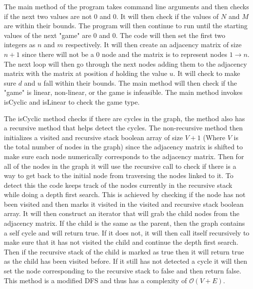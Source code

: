 \documentclass[11pt]{article}
\begin{document}
The main method of the program takes command line arguments and then checks if the next two values are not $0$ and $0$. It will then check if the values of $N$ and $M$ are within their bounds. The program will then continue to run until the starting values of the next "game" are $0$ and $0$. The code will then set the first two integers as $n$ and $m$ respectively. It will then create an adjacency matrix of size $n + 1$ since there will not be a $0$ node and the matrix is to represent nodes $ 1\rightarrow  n$. The next loop will then go through the next nodes adding them to the adjacency matrix with the matrix at position $d$ holding the value $u$. It will check to make sure $d$ and $u$ fall within their bounds. The main method will then check if the "game" is linear, non-linear, or the game is infeasible. The main method invokes isCyclic and isLinear to check the game type.

The isCyclic method checks if there are cycles in the graph, the method also has a recursive method that helps detect the cycles. The non-recursive method then initializes a visited and recursive stack boolean array of size $V + 1$ (Where $V$ is the total number of nodes in the graph) since the adjacency matrix is shifted to make sure each node numerically corresponds to the adjacency matrix. Then for all of the nodes in the graph it will use the recursive call to check if there is a way to get back to the initial node from traversing the nodes linked to it. To detect this the code keeps track of the nodes currently in the recursive stack while doing a depth first search. This is achieved by checking if the node has not been visited and then marks it visited in the visited and recursive stack boolean array. It will then construct an iterator that will grab the child nodes from the adjacency matrix. If the child is the same as the parent, then the graph contains a self cycle and will return true. If it does not, it will then call itself recursively to make sure that it has not visited the child and continue the depth first search. Then if the recursive stack of the child is marked as true then it will return true as the child has been visited before. If it still has not detected a cycle it will then set the node corresponding to the recursive stack to false and then return false. This method is a modified DFS and thus has a complexity of $\mathcal{O}(V+E)$.
\end{document}
